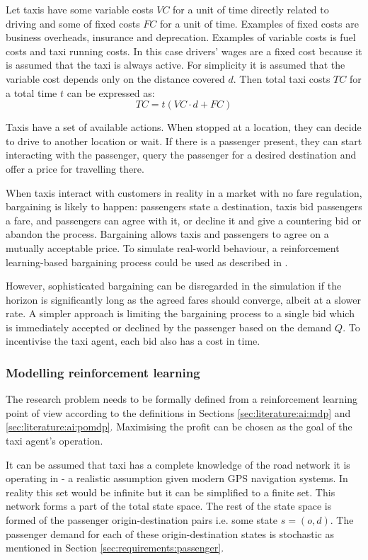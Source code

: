 Let taxis have some variable costs \(VC\) for a unit of time directly related
to driving and some of fixed costs \(FC\) for a unit of time. Examples of fixed
costs are business overheads, insurance and deprecation. Examples of variable
costs is fuel costs and taxi running costs. In this case drivers' wages are a
fixed cost because it is assumed that the taxi is always active. For simplicity
it is assumed that the variable cost depends only on the distance covered
\(d\). Then total taxi costs \(TC\) for a total time \(t\) can be expressed as:
\[ TC = t(VC\cdot d + FC) \]

Taxis have a set of available actions. When stopped at a location, they can
decide to drive to another location or wait. If there is a passenger present,
they can start interacting with the passenger, query the passenger for a
desired destination and offer a price for travelling there.

When taxis interact with customers in reality in a market with no fare
regulation, bargaining is likely to happen: passengers state a destination,
taxis bid passengers a fare, and passengers can agree with it, or decline it
and give a countering bid or abandon the process. Bargaining allows taxis and
passengers to agree on a mutually acceptable price. To simulate real-world
behaviour, a reinforcement learning-based bargaining process could be used as
described in \textcite{Cli1997taxi+bargaining}.

However, sophisticated bargaining can be disregarded in the simulation if the
horizon is significantly long as the agreed fares should converge, albeit at a
slower rate. A simpler approach is limiting the bargaining process to a single
bid which is immediately accepted or declined by the passenger based on the
demand \(Q\). To incentivise the taxi agent, each bid also has a cost in time.


\subsubsection{Modelling reinforcement learning}
\label{sec:requirements:ai}

The research problem needs to be formally defined from a reinforcement learning
point of view according to the definitions in Sections
\ref{sec:literature:ai:mdp} and \ref{sec:literature:ai:pomdp}. Maximising the
profit can be chosen as the goal of the taxi agent's operation.

It can be assumed that taxi has a complete knowledge of the road network it is
operating in - a realistic assumption given modern GPS navigation systems. In
reality this set would be infinite but it can be simplified to a finite set.
This network forms a part of the total state space. The rest of the state space
is formed of the passenger origin-destination pairs i.e. some state \(s = (o,
d) \). The passenger demand for each of these origin-destination states is
stochastic as mentioned in Section \ref{sec:requirements:passenger}. 


